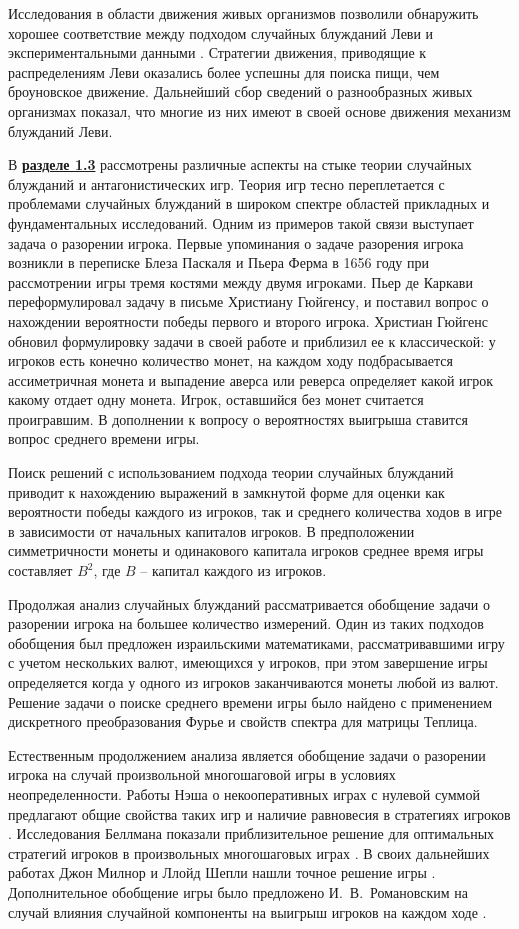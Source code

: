 Исследования в области движения живых организмов позволили обнаружить хорошее соответствие между подходом случайных блужданий Леви и экспериментальными данными \cite{shlesinger_levy_1986}. Стратегии движения, приводящие к распределениям Леви оказались более успешны для поиска пищи, чем броуновское движение. Дальнейший сбор сведений о разнообразных живых организмах показал, что многие из них имеют в своей основе движения механизм блужданий Леви.

В \underline{\textbf{разделе 1.3}} рассмотрены различные аспекты на стыке теории случайных блужданий и антагонистических игр. Теория игр тесно переплетается с проблемами случайных блужданий в широком спектре областей прикладных и фундаментальных исследований. Одним из примеров такой связи выступает задача о разорении игрока. Первые упоминания о задаче разорения игрока возникли в переписке Блеза Паскаля и Пьера Ферма в 1656 году при рассмотрении игры тремя костями между двумя игроками. Пьер де Каркави переформулировал задачу в письме Христиану Гюйгенсу, и поставил вопрос о нахождении вероятности победы первого и второго игрока. Христиан Гюйгенс обновил формулировку задачи в своей работе и приблизил ее к классической: у игроков есть конечно количество монет, на каждом ходу подбрасывается ассиметричная монета и выпадение аверса или реверса определяет какой игрок какому отдает одну монета. Игрок, оставшийся без монет считается проигравшим. В дополнении к вопросу о вероятностях выигрыша ставится вопрос среднего времени игры.

Поиск решений с использованием подхода теории случайных блужданий приводит к нахождению выражений в замкнутой форме для оценки как вероятности победы каждого из игроков, так и среднего количества ходов в игре в зависимости от начальных капиталов игроков. В предположении симметричности монеты и одинакового капитала игроков среднее время игры составляет $B^2$, где $B$ -- капитал каждого из игроков.

Продолжая анализ случайных блужданий рассматривается обобщение задачи о разорении игрока на большее количество измерений. Один из таких подходов обобщения был предложен израильскими математиками, рассматривавшими игру с учетом нескольких валют, имеющихся у игроков, при этом завершение игры определяется когда у одного из игроков заканчиваются монеты любой из валют. Решение задачи о поиске среднего времени игры было найдено с применением дискретного преобразования Фурье и свойств спектра для матрицы Теплица. 

Естественным продолжением анализа является обобщение задачи о разорении игрока на случай произвольной многошаговой игры в условиях неопределенности. Работы Нэша о некооперативных играх с нулевой суммой предлагают общие свойства таких игр и наличие равновесия в стратегиях игроков \cite{nash_non-cooperative_1951}. Исследования Беллмана показали приблизительное решение для оптимальных стратегий игроков в произвольных многошаговых играх \cite{bellman_decision-making_1954}. В своих дальнейших работах Джон Милнор и Ллойд Шепли нашли точное решение игры \cite{milnor_games_1956}. Дополнительное обобщение игры было предложено И.~В.~Романовским на случай влияния случайной компоненты на выигрыш игроков на каждом ходе \cite{romanovsky_1961}. 

